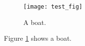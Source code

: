 \documentclass{article}
\begin{document}
\begin{figure}
  \texttt{[image: test\_fig]}
  \caption{A boat.}
  \label{fig:boat1}
\end{figure}

Figure \ref{fig:boat1} shows a boat.
\end{document}
